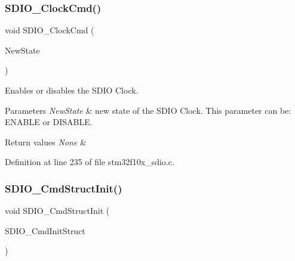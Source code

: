 \subsubsection{\texorpdfstring{S\+D\+I\+O\+\_\+\+Clock\+Cmd()}{SDIO\_ClockCmd()}}
{\footnotesize\ttfamily void S\+D\+I\+O\+\_\+\+Clock\+Cmd (\begin{DoxyParamCaption}\item[{\hyperlink{group___exported__types_gac9a7e9a35d2513ec15c3b537aaa4fba1}{Functional\+State}}]{New\+State }\end{DoxyParamCaption})}



Enables or disables the S\+D\+IO Clock. 


\begin{DoxyParams}{Parameters}
{\em New\+State} & new state of the S\+D\+IO Clock. This parameter can be\+: E\+N\+A\+B\+LE or D\+I\+S\+A\+B\+LE. \\
\hline
\end{DoxyParams}

\begin{DoxyRetVals}{Return values}
{\em None} & \\
\hline
\end{DoxyRetVals}


Definition at line 235 of file stm32f10x\+\_\+sdio.\+c.

\mbox{\label{group___s_d_i_o___private___functions_ga09d9e89f49c87c82aec79c97b7068e24}} 
\subsubsection{\texorpdfstring{S\+D\+I\+O\+\_\+\+Cmd\+Struct\+Init()}{SDIO\_CmdStructInit()}}
{\footnotesize\ttfamily void S\+D\+I\+O\+\_\+\+Cmd\+Struct\+Init (\begin{DoxyParamCaption}\item[{\hyperlink{struct_s_d_i_o___cmd_init_type_def}{S\+D\+I\+O\+\_\+\+Cmd\+Init\+Type\+Def} $\ast$}]{S\+D\+I\+O\+\_\+\+Cmd\+Init\+Struct }\end{DoxyParamCaption})}



